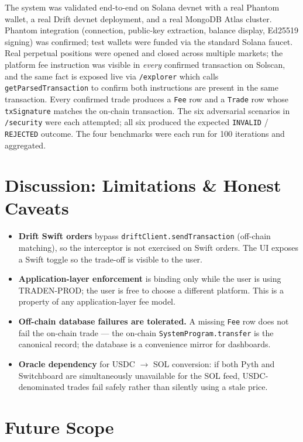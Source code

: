 \documentclass[11pt,a4paper]{article}
\begin{document}
The system was validated end-to-end on Solana devnet with a real Phantom wallet, a real Drift devnet deployment, and a real MongoDB Atlas cluster. Phantom integration (connection, public-key extraction, balance display, Ed25519 signing) was confirmed; test wallets were funded via the standard Solana faucet. Real perpetual positions were opened and closed across multiple markets; the platform fee instruction was visible in \textit{every} confirmed transaction on Solscan, and the same fact is exposed live via \texttt{/explorer} which calls \texttt{getParsedTransaction} to confirm both instructions are present in the same transaction. Every confirmed trade produces a \texttt{Fee} row and a \texttt{Trade} row whose \texttt{txSignature} matches the on-chain transaction. The six adversarial scenarios in \texttt{/security} were each attempted; all six produced the expected \texttt{INVALID} / \texttt{REJECTED} outcome. The four benchmarks were each run for 100 iterations and aggregated.

\section{Discussion: Limitations \& Honest Caveats}

\begin{itemize}
    \item \textbf{Drift Swift orders} bypass \texttt{driftClient.sendTransaction} (off-chain matching), so the interceptor is not exercised on Swift orders. The UI exposes a Swift toggle so the trade-off is visible to the user.
    \item \textbf{Application-layer enforcement} is binding only while the user is using TRADEN-PROD; the user is free to choose a different platform. This is a property of any application-layer fee model.
    \item \textbf{Off-chain database failures are tolerated.} A missing \texttt{Fee} row does not fail the on-chain trade --- the on-chain \texttt{SystemProgram.transfer} is the canonical record; the database is a convenience mirror for dashboards.
    \item \textbf{Oracle dependency} for USDC $\rightarrow$ SOL conversion: if both Pyth and Switchboard are simultaneously unavailable for the SOL feed, USDC-denominated trades fail safely rather than silently using a stale price.
\end{itemize}

\section{Future Scope}
\end{document}

